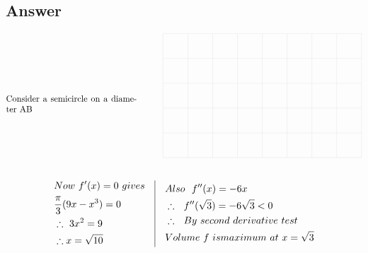 \documentclass[14pt]{extarticle}
\begin{document}
\begin{fleqn}
\subsection*{Answer}
\begin{equation} \nonumber
\begin{alignedat}{4}
\begin{minipage}{15em}
  Consider a semicircle on a diameter AB
  \end{minipage}
\end{alignedat}
\quad\quad\quad
\begin{alignedat}{4}
\begin{tikzpicture}
\draw[very thin, gray!40, step=1 cm](0,0) grid (8,5);\end{tikzpicture}\\\
\end{alignedat}
\end{equation}
\begin{equation} \nonumber
\begin{alignedat}{4}
& Now\ f'(x) = 0\ gives\\
& \frac{\pi}{3}(9x - x^3)=0\\
& \therefore \ 3x^2=9\\
& \therefore x = \sqrt{10}
\end{alignedat}
\quad
\vrule
\quad
\begin{alignedat}{4}
& Also\ \ f''(x) =-6x\\
& \therefore\ \ f''(\sqrt{3})=-6\sqrt{3}<0\\
& \therefore \ \ By\ second\ derivative\ test\\
& Volume \ f\ is maximum\ at\ x=\sqrt{3}
\end{alignedat}
\end{equation}


\end{fleqn}
\end{document}
